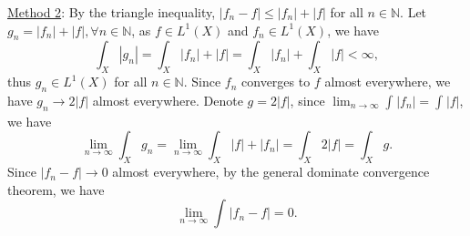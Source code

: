 \documentclass[12pt,a4paper]{ctexart}
\begin{document}
\underline{Method 2}: By the triangle inequality, $|f_n - f| \leq |f_n| + |f|$ for all $n \in \mathbb N$. Let $g_n = |f_n| + |f|, \forall n \in \mathbb N$, as $f \in L^{1} (X)$ and $f_n \in L^{1} (X)$, we have
$$\int_{X} |g_n| = \int_{X} |f_n| + |f| = \int_{X} |f_n| + \int_{X} |f| < \infty,$$
thus $g_n \in L^1(X)$ for all $n \in \mathbb N$. Since $f_{n}$ converges to $f$ almost everywhere, we have $g_n \to 2 |f|$ almost everywhere. Denote $g = 2 |f|$, since $\lim_{n \to \infty} \int_{}^{} |f_{n}| = \int_{}^{} |f|$, we have
$$\lim_{n \to \infty} \int_{X}^{} g_{n} = \lim_{n \to \infty} \int_{X}^{} |f| + |f_n| = \int_{X}^{} 2 |f| = \int_{X}^{} g.$$
Since $|f_n - f| \to 0$ almost everywhere, by the general dominate convergence theorem, we have
$$\lim_{n \to \infty} \int_{}^{} |f_{n} - f| = 0.$$
\end{document}
